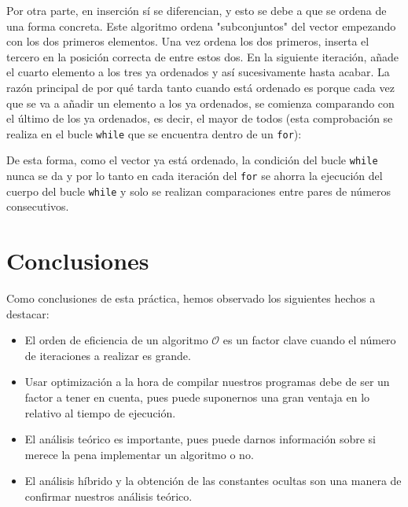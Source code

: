 \documentclass[10pt,a4paper]{article}
\begin{document}
Por otra parte, en inserción sí se diferencian, y esto se debe a que se ordena de una forma concreta. Este algoritmo ordena "subconjuntos" del vector empezando con los dos primeros elementos. Una vez ordena los dos primeros, inserta el tercero en la posición correcta de entre estos dos. En la siguiente iteración, añade el cuarto elemento a los tres ya ordenados y así sucesivamente hasta acabar. La razón principal de por qué tarda tanto cuando está ordenado es porque cada vez que se va a añadir un elemento a los ya ordenados, se comienza comparando con el último de los ya ordenados, es decir, el mayor de todos (esta comprobación se realiza en el bucle \texttt{while} que se encuentra dentro de un \texttt{for}):



De esta forma, como el vector ya está ordenado, la condición del bucle \texttt{while} nunca se da y por lo tanto en cada iteración del \texttt{for} se ahorra la ejecución del cuerpo del bucle \texttt{while} y solo se realizan comparaciones entre pares de números consecutivos.

\newpage

\section{Conclusiones}

Como conclusiones de esta práctica, hemos observado los siguientes hechos a destacar:
\begin{itemize}
	\item El orden de eficiencia de un algoritmo \(\mathcal{O}\) es un factor clave cuando el número de iteraciones a realizar es grande.
	\item Usar optimización a la hora de compilar nuestros programas debe de ser un factor a tener en cuenta, pues puede suponernos una gran ventaja en lo relativo al tiempo de ejecución.
	\item El análisis teórico es importante, pues puede darnos información sobre si merece la pena implementar un algoritmo o no.
	\item El análisis híbrido y la obtención de las constantes ocultas son una manera de confirmar nuestros análisis teórico.
\end{itemize}
\end{document}
